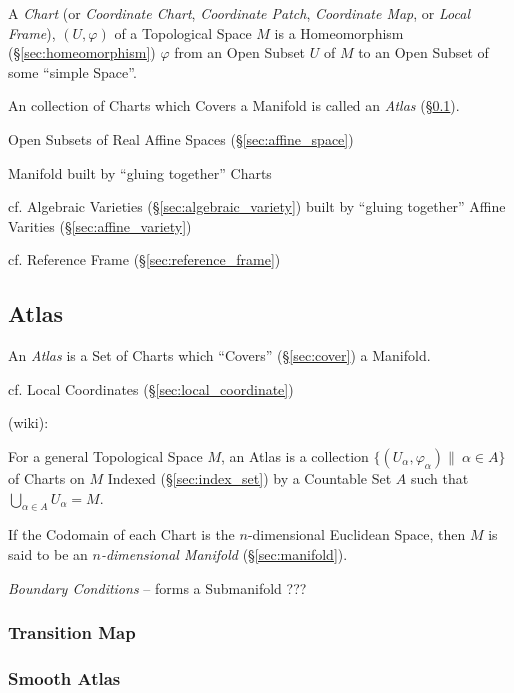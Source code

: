 A \emph{Chart} (or \emph{Coordinate Chart}, \emph{Coordinate Patch},
\emph{Coordinate Map}, or \emph{Local Frame}), $(U, \varphi)$ of a Topological
Space $M$ is a Homeomorphism (\S\ref{sec:homeomorphism}) $\varphi$ from an Open
Subset $U$ of $M$ to an Open Subset of some ``simple Space''.

An collection of Charts which Covers a Manifold is called an \emph{Atlas}
(\S\ref{sec:atlas}).

Open Subsets of Real Affine Spaces (\S\ref{sec:affine_space})

Manifold built by ``gluing together'' Charts

cf. Algebraic Varieties (\S\ref{sec:algebraic_variety}) built by ``gluing
together'' Affine Varities (\S\ref{sec:affine_variety})

\fist cf. Reference Frame (\S\ref{sec:reference_frame})



\subsection{Atlas}\label{sec:atlas}

An \emph{Atlas} is a Set of Charts which ``Covers'' (\S\ref{sec:cover}) a
Manifold.

\fist cf. Local Coordinates (\S\ref{sec:local_coordinate})

(wiki):

For a general Topological Space $M$, an Atlas is a collection $\{(U_\alpha,
\varphi_\alpha) \|\ \alpha \in A \}$ of Charts on $M$ Indexed
(\S\ref{sec:index_set}) by a Countable Set $A$ such that
$\bigcup_{\alpha\in{A}} U_\alpha = M$.

If the Codomain of each Chart is the $n$-dimensional Euclidean Space, then $M$
is said to be an \emph{$n$-dimensional Manifold} (\S\ref{sec:manifold}).

\emph{Boundary Conditions} -- forms a Submanifold ???



\subsubsection{Transition Map}\label{sec:transition_map}

\subsubsection{Smooth Atlas}\label{sec:smooth_atlas}

